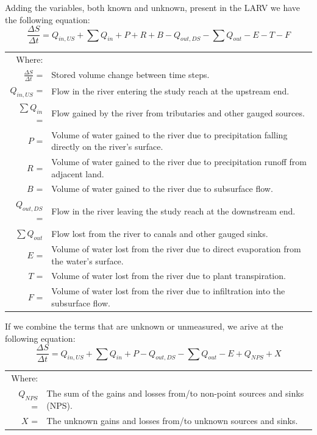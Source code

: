 \begin{linenumbers}
Adding the variables, both known and unknown, present in the LARV we have the following equation:
\begin{equation}
	\frac{\Delta S}{\Delta t} = Q_{in,US} + \sum Q_{in} + P + R + B - Q_{out,DS} - \sum Q_{out} - E - T - F 
\end{equation}
\begin{longtable}{rl}
	Where: \\
	$\frac{\Delta S}{\Delta t}$ =&Stored volume change between time steps.\\
	$ Q_{in,US} $ = & Flow in the river entering the study reach at the upstream end.\\
	$ \sum Q_{in} $ = & Flow gained by the river from tributaries and other gauged sources.\\
	$ P $ = & Volume of water gained to the river due to precipitation falling directly on the river's surface.\\
	$ R $ = & Volume of water gained to the river due to precipitation runoff from adjacent land. \\
	$ B $ = & Volume of water gained to the river due to subsurface flow. \\
	$ Q_{out,DS} $ = & Flow in the river leaving the study reach at the downstream end.\\
	$ \sum Q_{out} $ & Flow lost from the river to canals and other gauged sinks.\\
	$ E $ = & Volume of water lost from the river due to direct evaporation from the water's surface.\\
	$ T $ = & Volume of water lost from the river due to plant transpiration.\\
	$ F $ = & Volume of water lost from the river due to infiltration into the subsurface flow.\\
\end{longtable}

If we combine the terms that are unknown or unmeasured, we arive at the following equation:
\begin{equation}\label{eq:water01}
	\frac{\Delta S}{\Delta t} = Q_{in,US} + \sum Q_{in} + P - Q_{out,DS} - \sum Q_{out} - E + Q_{NPS} + X
\end{equation}
\begin{tabularx}{6in}{rX}
	Where: \\
	$ Q_{NPS} $ = & The sum of the gains and losses from/to non-point sources and sinks (NPS).\\ 
	$ X $ = & The unknown gains and losses from/to unknown sources and sinks.\\
\end{tabularx}\\


\end{linenumbers}
